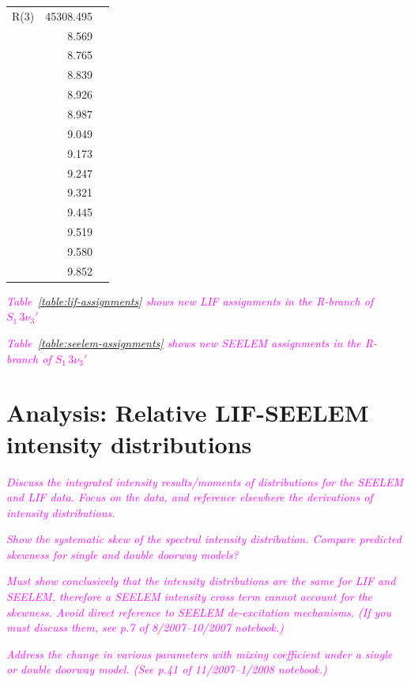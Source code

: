 \documentclass[12pt]{mitthesis}
\newcommand{\POINT}[1]{\textcolor{magenta}{\emph{#1}}}
\newcommand{\sing}{$S_1\,3\nu_3'$ }
\begin{document}
\begin{table}
{\begin{tabular}[t]{l r r}
R(3) & 45308.495 \\
     &     8.569 \\
     &     8.765 \\
     \cmidrule{2-2}
     &     8.839 \\
     &     8.926 \\
     &     8.987 \\
     &     9.049 \\
     &     9.173 \\
     &     9.247 \\
     &     9.321 \\
     &     9.445 \\
     &     9.519 \\
     &     9.580 \\
     &     9.852 \\
    \bottomrule
  \end{tabular}}
\end{table}

\POINT{Table~\ref{table:lif-assignments} shows new LIF assignments in the R-branch of \sing}

\POINT{Table~\ref{table:seelem-assignments} shows new SEELEM assignments in the R-branch of \sing}

\section{Analysis: Relative LIF-SEELEM intensity distributions}

\POINT{Discuss the integrated intensity results/moments of distributions
  for the SEELEM and LIF data. Focus on the data, and reference
  elsewhere the derivations of intensity distributions.}

\POINT{Show the systematic skew of the spectral intensity
  distribution.  Compare predicted skewness for single and double
  doorway models?}

\POINT{Must show conclusively that the intensity distributions are the
  same for LIF and SEELEM, therefore a SEELEM intensity cross term
  cannot account for the skewness.  Avoid direct reference to SEELEM
  de-excitation mechanisms.  (If you must discuss them, see p.7 of
  8/2007--10/2007 notebook.)}

\POINT{Address the change in various parameters with mixing
  coefficient under a single or double doorway model. (See p.41 of
  11/2007--1/2008 notebook.)}
\end{document}
